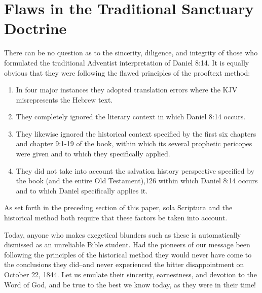 \chapter{Flaws in the Traditional Sanctuary Doctrine}
\label{ch:flaws}

There can be no question as to the sincerity, diligence, and integrity of
those who formulated the traditional Adventist interpretation of
Daniel 8:14. It is equally obvious that they were following the flawed
principles of the prooftext method:
\begin{enumerate}
	\item In four major instances they adopted
translation errors where the KJV misrepresents the Hebrew text. 
	\item They
completely ignored the literary context in which Daniel 8:14 occurs.
	\item They likewise ignored the historical context specified by the first six
chapters and chapter 9:1-19 of the book, within which its several prophetic
pericopes were given and to which they specifically applied.
	\item They did not take into account the salvation history perspective 
specified by the 
book (and the entire Old Testament),126 within which Daniel 8:14 occurs and
to which Daniel specifically applies it.
\end{enumerate}
As set forth in the preceding
section of this paper, sola Scriptura and the historical method both require
that these factors be taken into account.

Today, anyone who makes exegetical blunders such as these is automatically
dismissed as an unreliable Bible student. Had the pioneers of our message
been following the principles of the historical method they would never have
come to the conclusions they did--and never experienced the bitter
disappointment on October 22, 1844. Let us emulate their sincerity,
earnestness, and devotion to the Word of God, and be true to the best we
know today, as they were in their time!

